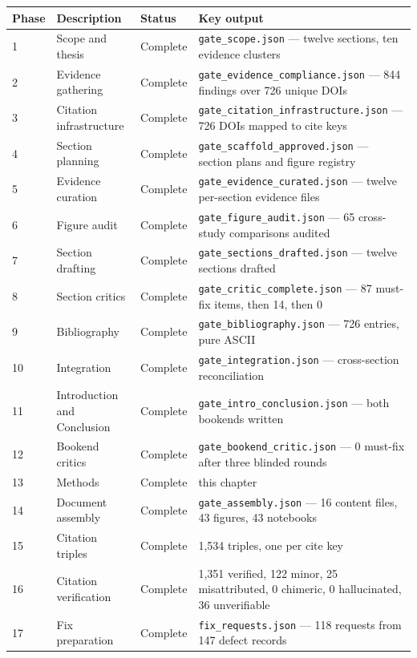 \documentclass[11pt]{article}
\begin{document}
\begin{table}[H]
\centering
\small
\begin{tabular}{llll}
\toprule
\textbf{Phase} & \textbf{Description} & \textbf{Status} & \textbf{Key output} \\
\midrule
1 & Scope and thesis & Complete & \texttt{gate\_scope.json} --- twelve sections, ten evidence clusters \\
2 & Evidence gathering & Complete & \texttt{gate\_evidence\_compliance.json} --- 844 findings over 726 unique DOIs \\
3 & Citation infrastructure & Complete & \texttt{gate\_citation\_infrastructure.json} --- 726 DOIs mapped to cite keys \\
4 & Section planning & Complete & \texttt{gate\_scaffold\_approved.json} --- section plans and figure registry \\
5 & Evidence curation & Complete & \texttt{gate\_evidence\_curated.json} --- twelve per-section evidence files \\
6 & Figure audit & Complete & \texttt{gate\_figure\_audit.json} --- 65 cross-study comparisons audited \\
7 & Section drafting & Complete & \texttt{gate\_sections\_drafted.json} --- twelve sections drafted \\
8 & Section critics & Complete & \texttt{gate\_critic\_complete.json} --- 87 must-fix items, then 14, then 0 \\
9 & Bibliography & Complete & \texttt{gate\_bibliography.json} --- 726 entries, pure ASCII \\
10 & Integration & Complete & \texttt{gate\_integration.json} --- cross-section reconciliation \\
11 & Introduction and Conclusion & Complete & \texttt{gate\_intro\_conclusion.json} --- both bookends written \\
12 & Bookend critics & Complete & \texttt{gate\_bookend\_critic.json} --- 0 must-fix after three blinded rounds \\
13 & Methods & Complete & this chapter \\
14 & Document assembly & Complete & \texttt{gate\_assembly.json} --- 16 content files, 43 figures, 43 notebooks \\
15 & Citation triples & Complete & 1,534 triples, one per cite key \\
16 & Citation verification & Complete & 1,351 verified, 122 minor, 25 misattributed, 0 chimeric, 0 hallucinated, 36 unverifiable \\
17 & Fix preparation & Complete & \texttt{fix\_requests.json} --- 118 requests from 147 defect records \\

\end{tabular}
\end{table}
\end{document}
